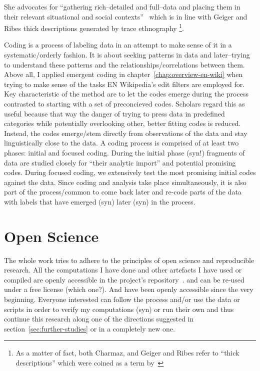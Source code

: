 She advocates for ``gathering rich–detailed and full–data and placing them in their relevant situational and social contexts''~\cite[p.10-11]{Charmaz2006} which is in line with Geiger and Ribes thick descriptions generated by trace ethnography
\footnote{As a matter of fact, both Charmaz, and Geiger and Ribes refer to ``thick descriptions'' which were coined as a term by~\cite{Geertz1973}}.

Coding is a process of labeling data in an attempt to make sense of it in a systematic/orderly fashion.
It is about seeking patterns in data and later–trying to understand these patterns and the relationships/correlations between them.
Above all, I applied emergent coding in chapter~\ref{chap:overview-en-wiki} when trying to make sense of the tasks EN Wikipedia's edit filters are employed for.
Key characteristic of the method are to let the codes emerge during the process contrasted to starting with a set of preconcieved codes.
Scholars regard this as useful because that way the danger of trying to press data in predefined categories while potentially overlooking other, better fitting codes is reduced.
Instead, the codes emerge/stem directly from observations of the data and stay linguistically close to the data.
A coding process is comprised of at least two phases: initial and focused coding.
During the initial phase (syn!) fragments of data are studied closely for ``their analytic import'' and potential promising codes.
During focused coding, we extensively test the most promising initial codes against the data.
Since coding and analysis take place simultaneously, it is also part of the process/common to come back later and re-code parts of the data with labels that have emerged (syn) later (syn) in the process.

\begin{comment}
Grounded Theory~\cite{Charmaz2006}
# Coding in GT
Axial Coding: %
"relates categories to subcategories, specifies the properties and dimensions of a category" (p.60)

\end{comment}

\section{Open Science}

The whole work tries to adhere to the principles of open science and reproducible research. %
All the computations I have done and other artefacts I have used or compiled are openly accessible in the project's repository~\cite{github}.
and can be re-used under a free license (which one?).
And have been openly accessible since the very beginning.
Everyone interested can follow the process and/or use the data or scripts in order to verify my computations (syn) or run their own and thus continue this research along one of the directions suggested in section~\ref{sec:further-studies} or in a completely new one.

